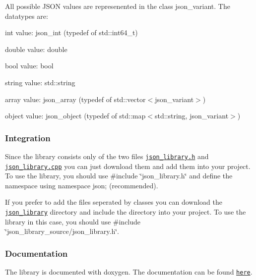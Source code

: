 All possible J\+S\+ON values are represenented in the class {\ttfamily json\+\_\+variant}. The datatypes are\+:
\begin{DoxyItemize}
\item int value\+: {\ttfamily json\+\_\+int} (typedef of {\ttfamily std\+::int64\+\_\+t})
\item double value\+: {\ttfamily double}
\item bool value\+: {\ttfamily bool}
\item string value\+: {\ttfamily std\+::string}
\item array value\+: {\ttfamily json\+\_\+array} (typedef of {\ttfamily std\+::vector$<$json\+\_\+variant$>$})
\item object value\+: {\ttfamily json\+\_\+object} (typedef of {\ttfamily std\+::map$<$std\+::string, json\+\_\+variant$>$})
\end{DoxyItemize}

\subsubsection*{\label{_integration_section}%
Integration}

Since the library consists only of the two files \href{https://github.com/n0dex/cppjsonlib/blob/master/json_library.h}{\tt json\+\_\+library.\+h} and \href{https://github.com/n0dex/cppjsonlib/blob/master/json_library.cpp}{\tt json\+\_\+library.\+cpp} you can just download them and add them into your project. To use the library, you should use {\ttfamily \#include \char`\"{}json\+\_\+library.\+h\char`\"{}} and define the namespace {\ttfamily using namespace json;} (recommended).

If you prefer to add the files seperated by classes you can download the \href{https://github.com/n0dex/cppjsonlib/tree/master/json_library_source}{\tt json\+\_\+library} directory and include the directory into your project. To use the library in this case, you should use {\ttfamily \#include \char`\"{}json\+\_\+library\+\_\+source/json\+\_\+library.\+h\char`\"{}}.

\subsubsection*{\label{_doc_section}%
Documentation}

The library is documented with doxygen. The documentation can be found \href{https://github.com/n0dex/cppjsonlib/tree/master/json_library_documentation}{\tt here}.

